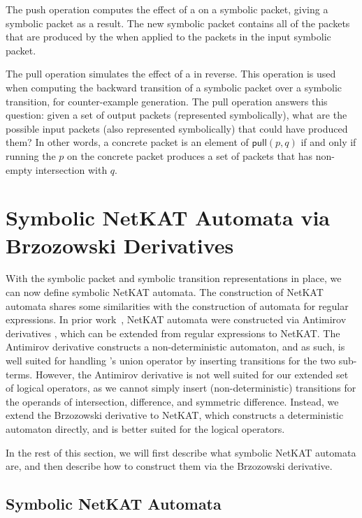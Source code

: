 \documentclass[acmsmall,dvipsnames,nonacm]{acmart}
\begin{document}
The push operation computes the effect of a \SPPn{} on a symbolic packet, giving a symbolic packet as a result. The new symbolic packet contains all of the packets that are produced by the \SPPn{} when applied to the packets in the input symbolic packet.

The pull operation simulates the effect of a \SPPn{} in reverse.
This operation is used when computing the backward transition of a symbolic packet over a symbolic transition, for counter-example generation.
The pull operation answers this question: given a set of output packets (represented symbolically), what are the possible input packets (also represented symbolically) that could have produced them?
In other words, a concrete packet is an element of $\mathsf{pull}(p,q)$ if and only if running the \SPPn{} $p$ on the concrete packet produces a set of packets that has non-empty intersection with $q$.

\section{Symbolic NetKAT Automata via Brzozowski Derivatives}\label{sec:symaut}

With the symbolic packet and symbolic transition representations in
place, we can now define symbolic NetKAT automata.  The construction
of NetKAT automata shares some similarities with the construction of
automata for regular expressions.  In prior
work~\cite{Foster2015,Smolka2015}, NetKAT automata were constructed
via Antimirov derivatives \cite{Antimirov1996}, which can be extended
from regular expressions to NetKAT.  The Antimirov derivative
constructs a non-deterministic automaton, and as such, is well suited
for handling \NetKAT's union operator by inserting transitions for the
two sub-terms.  However, the Antimirov derivative is not well suited
for our extended set of logical operators, as we cannot simply insert
(non-deterministic) transitions for the operands of intersection,
difference, and symmetric difference.  Instead, we extend the
Brzozowski derivative \cite{Brzozowski1962} to NetKAT, which
constructs a deterministic automaton directly, and is better suited
for the logical operators.

In the rest of this section, we will first describe what symbolic
NetKAT automata are, and then describe how to construct them via the
Brzozowski derivative.

\subsection{Symbolic NetKAT Automata}
\end{document}
